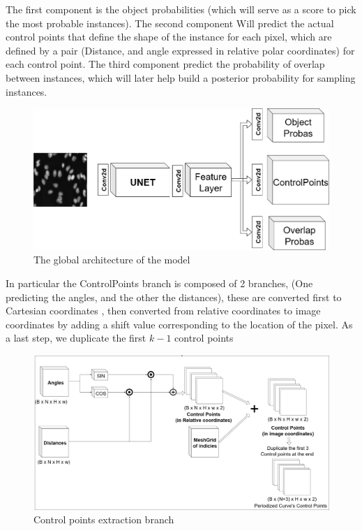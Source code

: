\documentclass[main.tex]{subfiles}
\begin{document}
The first component is the object probabilities (which will serve as a score to pick the most probable instances). The second component Will predict the actual control points that define the shape of the instance for each pixel, which are defined by a pair (Distance, and angle expressed in relative polar coordinates) for each control point. The third component predict the probability of overlap between instances, which will later help build a posterior probability for sampling instances. 

\begin{figure}[H]
    \centering
    \includegraphics[width=15cm]{presentationImages/splinedistModel.png}
    \caption{The global architecture of the model}
\end{figure}


In particular the ControlPoints branch is composed of 2 branches, (One predicting the angles, and the other the distances), these are converted first to Cartesian coordinates , then converted from relative coordinates to image coordinates by adding a shift value corresponding to the location of the pixel. As a last step, we duplicate the first $k-1$ control points

\begin{figure}[H]
    \centering
    \includegraphics[width=16cm]{presentationImages/ControlPoints.png}
    \caption{Control points extraction branch}
\end{figure}
\end{document}
